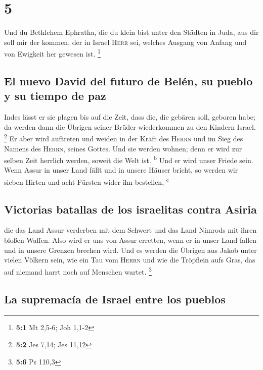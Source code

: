 \hypertarget{section-4}{%
\section{5}\label{section-4}}

 Und du Bethlehem Ephratha, die du klein bist unter den
Städten in Juda, aus dir soll mir der kommen, der in Israel
\textsc{Herr} sei, welches Ausgang von Anfang und von Ewigkeit her
gewesen ist. \footnote{\textbf{5:1} Mt 2,5-6; Joh 1,1-2}

\hypertarget{el-nuevo-david-del-futuro-de-beluxe9n-su-pueblo-y-su-tiempo-de-paz}{%
\subsection{El nuevo David del futuro de Belén, su pueblo y su tiempo de
paz}\label{el-nuevo-david-del-futuro-de-beluxe9n-su-pueblo-y-su-tiempo-de-paz}}

 Indes lässt er sie plagen bis auf die Zeit, dass die, die
gebären soll, geboren habe; da werden dann die Übrigen seiner Brüder
wiederkommen zu den Kindern Israel. \footnote{\textbf{5:2} Jes 7,14; Jes
  11,12}  Er aber wird auftreten und weiden in der Kraft
des \textsc{Herrn} und im Sieg des Namens des \textsc{Herrn}, seines
Gottes. Und sie werden wohnen; denn er wird zur selben Zeit herrlich
werden, soweit die Welt ist. \textsuperscript{b}  Und er
wird unser Friede sein. Wenn Assur in unser Land fällt und in unsere
Häuser bricht, so werden wir sieben Hirten und acht Fürsten wider ihn
bestellen, \textsuperscript{c}

\hypertarget{victorias-batallas-de-los-israelitas-contra-asiria}{%
\subsection{Victorias batallas de los israelitas contra
Asiria}\label{victorias-batallas-de-los-israelitas-contra-asiria}}

 die das Land Assur verderben mit dem Schwert und das Land
Nimrods mit ihren bloßen Waffen. Also wird er uns von Assur erretten,
wenn er in unser Land fallen und in unsere Grenzen brechen wird.
 Und es werden die Übrigen aus Jakob unter vielen Völkern
sein, wie ein Tau vom \textsc{Herrn} und wie die Tröpflein aufs Gras,
das auf niemand harrt noch auf Menschen wartet. \footnote{\textbf{5:6}
  Ps 110,3}

\hypertarget{la-supremacuxeda-de-israel-entre-los-pueblos}{%
\subsection{La supremacía de Israel entre los
pueblos}\label{la-supremacuxeda-de-israel-entre-los-pueblos}}

